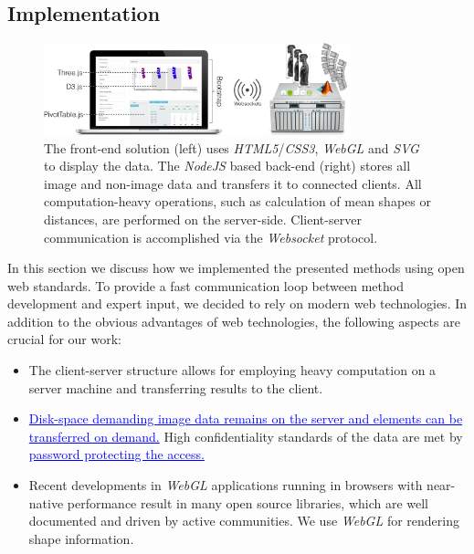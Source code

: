 \documentclass[journal]{style/vgtc} 			          %
\newcommand{\add}[1]{\textcolor{blue}{\uline{#1}}}
\begin{document}
\subsection{Implementation} \label{implementation}
\begin{figure}[htb]
 \centering
 \label{fig:technologies}
 \includegraphics[width=3.5in]{figures/technologies}
 \caption{The front-end solution (left) uses \emph{HTML5}/\emph{CSS3}, \emph{WebGL} and \emph{SVG} to display the data.
 The \emph{NodeJS} based back-end (right) stores all image and non-image data and transfers it to connected clients.
 All computation-heavy operations, such as calculation of mean shapes or distances, are performed on the server-side. 
 Client-server communication is accomplished via the \emph{Websocket} protocol.
 }
\end{figure}
In this section we discuss how we implemented the presented methods using open web standards.
%
To provide a fast communication loop between method development and expert input, we decided to rely on modern web technologies.
%
In addition to the obvious advantages of web technologies, the following aspects are crucial for our work:
\begin{itemize}
	\item The client-server structure allows for employing heavy computation on a server machine and transferring results to the client.
	\item \add{Disk-space demanding image data remains on the server and elements can be transferred on demand.}
	High confidentiality standards of the data are met by \add{password protecting the access.}%
	\item Recent developments in \emph{WebGL} applications running in browsers with near-native performance result in many open source libraries, which are well documented and driven by active communities. We use \emph{WebGL} for rendering shape information.
\end{itemize}
\end{document}
